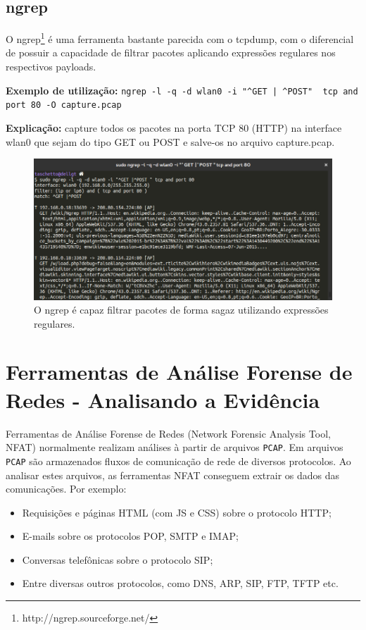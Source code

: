 \documentclass[12pt]{article}
\begin{document}
\subsection{ngrep}

O ngrep\footnote{http://ngrep.sourceforge.net/} é uma ferramenta bastante parecida com o tcpdump, com o diferencial de possuir a capacidade de filtrar pacotes aplicando expressões regulares nos respectivos payloads.

\textbf{Exemplo de utilização:} \texttt{ngrep -l -q -d wlan0 -i "\^{}GET | \^{}POST" \ tcp and port 80 -O capture.pcap}

\textbf{Explicação:} capture todos os pacotes na porta TCP 80 (HTTP) na interface wlan0 que sejam do tipo GET ou POST e salve-os no arquivo capture.pcap.

\begin{figure}[ht]
    \centering
    \includegraphics[scale=0.4]{img/ngrep.png}
    \caption{O ngrep é capaz filtrar pacotes de forma sagaz utilizando expressões regulares.}
    \label{fig:ngrep}
\end{figure}

\section{Ferramentas de Análise Forense de Redes - Analisando a Evidência}

Ferramentas de Análise Forense de Redes (Network Forensic Analysis Tool, NFAT) normalmente realizam análises à partir de arquivos \texttt{PCAP}. Em arquivos \texttt{PCAP} são armazenados fluxos de comunicação de rede de diversos protocolos. Ao analisar estes arquivos, as ferramentas NFAT conseguem extrair os dados das comunicações. Por exemplo:

\begin{itemize}
  \item Requisições e páginas HTML (com JS e CSS) sobre o protocolo HTTP;
  \item E-mails sobre os protocolos POP, SMTP e IMAP;
  \item Conversas telefônicas sobre o protocolo SIP;
  \item Entre diversas outros protocolos, como DNS, ARP, SIP, FTP, TFTP etc.
\end{itemize}
\end{document}
